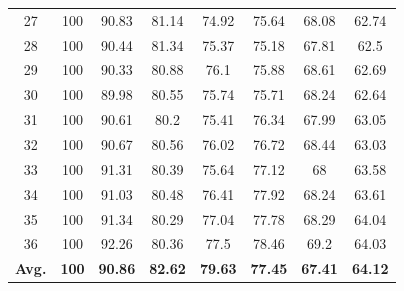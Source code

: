 \documentclass[review]{elsarticle}
\begin{document}
\begin{longtable}{c|ccccccc}
		27&100&90.83&81.14&74.92&75.64&68.08&62.74\\
		28&100&90.44&81.34&75.37&75.18&67.81&62.5\\
		29&100&90.33&80.88&76.1&75.88&68.61&62.69\\
		30&100&89.98&80.55&75.74&75.71&68.24&62.64\\
		31&100&90.61&80.2&75.41&76.34&67.99&63.05\\
		32&100&90.67&80.56&76.02&76.72&68.44&63.03\\
		33&100&91.31&80.39&75.64&77.12&68&63.58\\
		34&100&91.03&80.48&76.41&77.92&68.24&63.61\\
		35&100&91.34&80.29&77.04&77.78&68.29&64.04\\
		36&100&92.26&80.36&77.5&78.46&69.2&64.03\\
		\hline
		\textbf{Avg.}&\textbf{100}&\textbf{90.86}&\textbf{82.62}&\textbf{79.63}&\textbf{77.45}&\textbf{67.41}&\textbf{64.12}\\
		\hline\hline	
\end{longtable}
\end{document}
